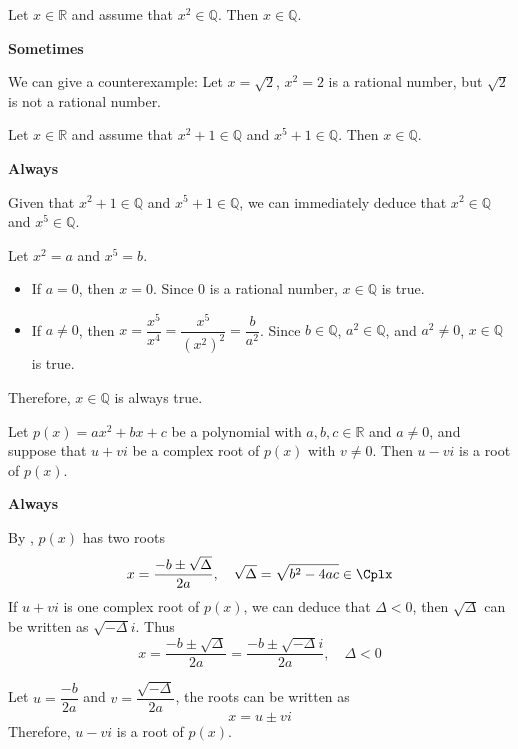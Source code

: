 \begin{chapex} %
Let $x \in \mathbb{R}$ and assume that $x^2 \in \mathbb{Q}$. Then $x \in \mathbb{Q}$.
\end{chapex}

\begin{mysolution}
    \textbf{Sometimes}

    We can give a counterexample: Let $x=\sqrt{2}$, $x^2=2$ is a rational number, but $\sqrt{2}$ is not a rational number.
\end{mysolution}

\begin{chapex} %
Let $x \in \mathbb{R}$ and assume that $x^2+1 \in \mathbb{Q}$ and $x^5+1 \in \mathbb{Q}$. Then $x \in \mathbb{Q}$.
\end{chapex}

\begin{mysolution}
    \textbf{Always}

    Given that $x^2 + 1 \in \mathbb{Q}$ and $x^5 + 1 \in \mathbb{Q}$, we can immediately deduce that $x^2 \in \mathbb{Q}$ and $x^5 \in \mathbb{Q}$.

    Let $x^2 = a$ and $x^5 = b$. 

    \begin{itemize}
        \item If $a = 0$, then $x = 0$. Since $0$ is a rational number, $x \in \mathbb{Q}$ is true.
        \item If $a \ne 0$, then $x = \dfrac{x^5}{x^4} = \dfrac{x^5}{(x^2)^2}=\dfrac{b}{a^2}$. Since $b \in \mathbb{Q}$, $a^2 \in \mathbb{Q}$, and $a^2 \neq 0$, $x \in \mathbb{Q}$ is true.
    \end{itemize}
    
    Therefore, $x \in \mathbb{Q}$ is always true.
\end{mysolution}

\begin{chapex} %
\label{cqGettingStartedASNEnd}
Let $p(x) = ax^2+bx+c$ be a polynomial with $a,b,c \in \mathbb{R}$ and $a \ne 0$, and suppose that $u+vi$ be a complex root of $p(x)$ with $v \ne 0$. Then $u-vi$ is a root of $p(x)$.
\end{chapex}

\begin{mysolution}
    \textbf{Always}

    By , $p(x)$ has two roots
    \[x=\dfrac{-b \pm \sqrt{\Delta}}{2a}, \quad \sqrt{\Delta}=\sqrt{b^2-4ac} \in \Cplx\]
    If $u+vi$ is one complex root of $p(x)$, we can deduce that $\Delta<0$, then $\sqrt{\Delta}$ can be written as $\sqrt{-\Delta} i$. Thus
    \[x=\dfrac{-b \pm \sqrt{\Delta}}{2a}=\dfrac{-b \pm \sqrt{-\Delta} i}{2a}, \quad \Delta < 0\]

    Let $u = \dfrac{-b}{2a}$ and $v=\dfrac{\sqrt{-\Delta}}{2a}$, the roots can be written as
    \[x = u \pm vi\]
    Therefore, $u-vi$ is a root of $p(x)$.
\end{mysolution}